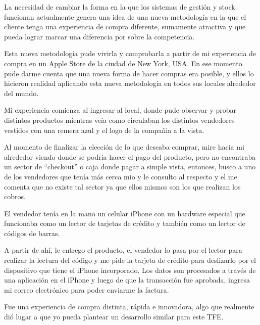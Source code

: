 
La necesidad de cambiar la forma en la que los sistemas de gesti\'on y stock funcionan actualmente genera una idea de una nueva metodolog\'ia en la que el cliente tenga una experiencia de compra diferente, sumamente atractiva y que pueda lograr marcar una diferencia por sobre la competencia.

Esta nueva metodolog\'ia pude vivirla y comprobarla a partir de mi experiencia de compra en un Apple Store de la ciudad de New York, USA. En ese momento pude darme cuenta que una nueva forma de hacer compras era posible, y ellos lo hicieron realidad aplicando esta nueva metodolog\'ia en todos sus locales alrededor del mundo.


Mi experiencia comienza al ingresar al local, donde pude observar y probar distintos productos mientras ve\'ia como circulaban los distintos vendedores vestidos con una remera azul y el logo de la compa\~nia a la vista.

Al momento de finalizar la elecci\'on de lo que deseaba comprar, mire hacia mi alrededor viendo donde se podr\'ia hacer el pago del producto, pero no encontraba un sector de ``checkout'' o caja donde pagar a simple vista, entonces, busco a uno de los vendedores que ten\'ia m\'as cerca mio y le consulto al respecto y el me comenta que no existe tal sector ya que ellos mismos son los que realizan los cobros.

El vendedor ten\'ia en la mano un celular iPhone con un hardware especial que funcionaba como un lector de tarjetas de cr\'edito y tambi\'en como un lector de c\'odigos de barras.


A partir de ah\'i, le entrego el producto, el vendedor lo pasa por el lector para realizar la lectura del c\'odigo y me pide la tarjeta de cr\'edito para deslizarlo por el dispositivo que tiene el iPhone incorporado. Los datos son procesados a trav\'es de una aplicaci\'on en el iPhone y luego de que la transacci\'on fue aprobada, ingresa mi correo electr\'onico para poder enviarme la factura.

Fue una experiencia de compra distinta, r\'apida e innovadora, algo que realmente di\'o lugar a que yo pueda plantear un desarrollo similar para este \ac{TFE}.
